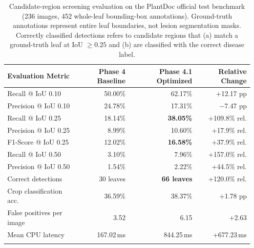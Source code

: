\documentclass[pdflatex,sn-mathphys-num]{sn-jnl}
\theoremstyle{thmstyleone}%
\theoremstyle{thmstyletwo}%
\theoremstyle{thmstylethree}%
\begin{document}
\begin{table}[htbp]
\caption{Candidate-region screening evaluation on the PlantDoc official test benchmark (236 images, 452 whole-leaf bounding-box annotations). Ground-truth annotations represent entire leaf boundaries, not lesion segmentation masks. Correctly classified detections refers to candidate regions that (a) match a ground-truth leaf at IoU $\geq 0.25$ and (b) are classified with the correct disease label.}\label{tab:screening_results}%
\footnotesize
\setlength{\tabcolsep}{3pt}%
\begin{tabular*}{\textwidth}{@{\extracolsep\fill}lrrr}
\toprule
\textbf{Evaluation Metric} & \textbf{Phase 4 Baseline} & \textbf{Phase 4.1 Optimized} & \textbf{Relative Change} \\
\midrule
Recall @ IoU 0.10        & 50.00\% & 62.17\% & +12.17 pp \\
Precision @ IoU 0.10     & 24.78\% & 17.31\% & $-7.47$ pp \\
Recall @ IoU 0.25        & 18.14\% & \textbf{38.05\%} & +109.8\% rel. \\
Precision @ IoU 0.25     &  8.99\% & 10.60\% & +17.9\% rel. \\
F1-Score @ IoU 0.25      & 12.02\% & \textbf{16.58\%} & +37.9\% rel. \\
Recall @ IoU 0.50        &  3.10\% &  7.96\% & +157.0\% rel. \\
Precision @ IoU 0.50     &  1.54\% &  2.22\% & +44.5\% rel. \\
Correct detections       & 30 leaves & \textbf{66 leaves} & +120.0\% rel. \\
Crop classification acc. & 36.59\% & 38.37\% & +1.78 pp \\
False positives per image & 3.52 & 6.15 & $+2.63$ \\
Mean CPU latency         & 167.02\,ms & 844.25\,ms & +677.23\,ms \\
\botrule
\end{tabular*}
\end{table}
\end{document}
